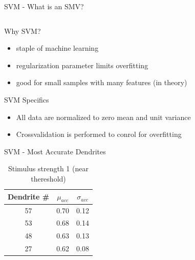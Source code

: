 \documentclass[10pt]{beamer}
\begin{document}
\begin{frame}[fragile]{SVM - What is an SMV?}
\begin{columns}[T,onlytextwidth]
  \end{columns}
\end{frame}

\begin{frame}[fragile]{Why SVM?}

\begin{itemize}
\item staple of machine learning
\item regularization parameter limits overfitting
\item good for small samples with many features (in theory)
\end{itemize}

\end{frame}

\begin{frame}[fragile]{SVM Specifics}
\begin{itemize}
\item All data are normalized to zero mean and unit variance
\item Crossvalidation is performed to conrol for overfitting
\end{itemize}

\end{frame}

\begin{frame}[fragile]{SVM - Most Accurate Dendrites}
\begin{table}
    \caption*{Stimulus strength 1 (near thereshold)}
    \begin{tabular}{c|c|c}
      \toprule
      Dendrite \# & $\mu_{acc}$ & $\sigma_{acc}$\\
      \midrule
      57 & 0.70 & 0.12\\
      53 & 0.68 & 0.14\\
      48 & 0.63 & 0.13\\
      27 & 0.62 & 0.08\\
      \bottomrule
    \end{tabular}
  \end{table}
\end{frame}
\end{document}
